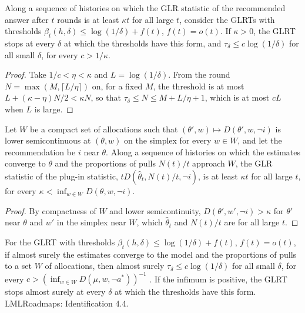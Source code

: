 \begin{lemma}
  \label{prereq:as_pathwise}
  \leanok
  Along a sequence of histories on which the GLR statistic of the recommended answer after $t$
  rounds is at least $\kappa t$ for all large $t$, consider the GLRTs with thresholds
  $\beta_t(h, \delta) \le \log(1/\delta) + f(t)$, $f(t) = o(t)$. If $\kappa > 0$, the GLRT stops
  at every $\delta$ at which the thresholds have this form, and $\tau_\delta \le c \log(1/\delta)$
  for all small $\delta$, for every $c > 1/\kappa$.
\end{lemma}

\begin{proof}
  \leanok
  Take $1/c < \eta < \kappa$ and $L = \log(1/\delta)$. From the round $N = \max(M, \lceil L/\eta
  \rceil)$ on, for a fixed $M$, the threshold is at most $L + (\kappa - \eta) N / 2 < \kappa N$, so
  that $\tau_\delta \le N \le M + L/\eta + 1$, which is at most $cL$ when $L$ is large.
\end{proof}

\begin{lemma}
  \label{prereq:glr_growth}
  \leanok
  Let $W$ be a compact set of allocations such that $(\theta', w) \mapsto D(\theta', w, \neg i)$ is
  lower semicontinuous at $(\theta, w)$ on the simplex for every $w \in W$, and let the
  recommendation be $i$ near $\theta$. Along a sequence of histories on which the estimates
  converge to $\theta$ and the proportions of pulls $N(t)/t$ approach $W$, the GLR statistic of the
  plug-in statistic, $t D(\hat\theta_t, N(t)/t, \neg i)$, is at least $\kappa t$ for all large $t$,
  for every $\kappa < \inf_{w \in W} D(\theta, w, \neg i)$.
\end{lemma}

\begin{proof}
  \leanok
  By compactness of $W$ and lower semicontinuity, $D(\theta', w', \neg i) > \kappa$ for $\theta'$
  near $\theta$ and $w'$ in the simplex near $W$, which $\hat\theta_t$ and $N(t)/t$ are for all
  large $t$.
\end{proof}

\begin{lemma}
  \label{prereq:as}
  \leanok
  For the GLRT with thresholds $\beta_t(h, \delta) \le \log(1/\delta) + f(t)$, $f(t) = o(t)$, if
  almost surely the estimates converge to the model and the proportions of pulls to a set $W$ of
  allocations, then almost surely $\tau_\delta \le c \log(1/\delta)$ for all small $\delta$, for
  every $c > (\inf_{w \in W} D(\mu, w, \neg a^*))^{-1}$ \cite[Proposition 13]{GK16}. If the
  infimum is positive, the GLRT stops almost surely at every $\delta$ at which the thresholds have
  this form. LMLRoadmaps: Identification 4.4.
\end{lemma}

